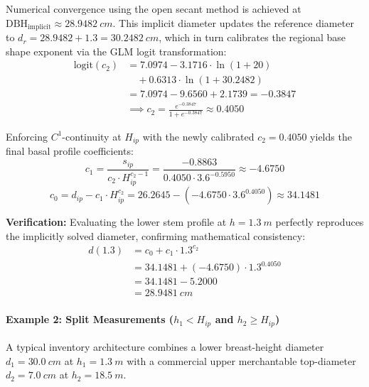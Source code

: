 \documentclass[twocolumn, bibliography=totoc]{scrartcl}
\begin{document}
Numerical convergence using the open secant method is achieved at $\text{DBH}_{\text{implicit}} \approx \qty{28.9482}{cm}$. This implicit diameter updates the reference diameter to $d_r = 28.9482 + 1.3 = \qty{30.2482}{cm}$, which in turn calibrates the regional base shape exponent via the GLM logit transformation:
\begin{equation}
\begin{aligned}
  \text{logit}(c_2) &= 7.0974 - 3.1716 \cdot \ln(1 + 20) \\
  &\quad + 0.6313 \cdot \ln(1 + 30.2482) \\
  &= 7.0974 - 9.6560 + 2.1739 = -0.3847 \\
  &\implies c_2 = \frac{e^{-0.3847}}{1 + e^{-0.3847}} \approx 0.4050
\end{aligned}
\end{equation}

Enforcing $C^1$-continuity at $H_{ip}$ with the newly calibrated $c_2 = 0.4050$ yields the final basal profile coefficients:
\begin{equation}
    c_1 = \frac{s_{ip}}{c_2 \cdot H_{ip}^{c_2-1}} = \frac{-0.8863}{0.4050 \cdot 3.6^{-0.5950}} \approx -4.6750
\end{equation}
\begin{equation}
    c_0 = d_{ip} - c_1 \cdot H_{ip}^{c_2} = 26.2645 - (-4.6750 \cdot 3.6^{0.4050}) \approx 34.1481
\end{equation}

\noindent \textbf{Verification:} Evaluating the lower stem profile at $h = \qty{1.3}{m}$ perfectly reproduces the implicitly solved diameter, confirming mathematical consistency:
\begin{equation}
\begin{aligned}
    d(1.3) &= c_0 + c_1 \cdot 1.3^{c_2} \\
    &= 34.1481 + (-4.6750) \cdot 1.3^{0.4050} \\
    &= 34.1481 - 5.2000 \\
    &= \qty{28.9481}{cm}
\end{aligned}
\end{equation}


\paragraph{Example 2: Split Measurements ($h_1 < H_{ip}$ and $h_2 \geq H_{ip}$)}
A typical inventory architecture combines a lower breast-height diameter $d_1 = \qty{30.0}{cm}$ at $h_1 = \qty{1.3}{m}$ with a commercial upper merchantable top-diameter $d_2 = \qty{7.0}{cm}$ at $h_2 = \qty{18.5}{m}$. 
\end{document}
